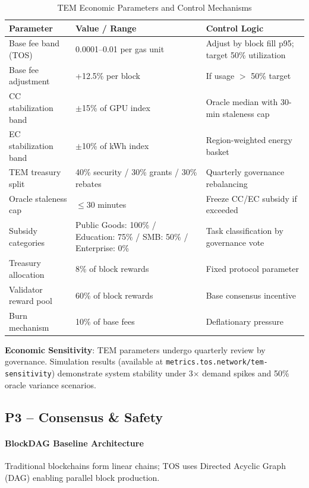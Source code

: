 \documentclass[11pt]{article}
\begin{document}
\begin{table}[H]
\centering
\caption{TEM Economic Parameters and Control Mechanisms}
\label{tab:tem-parameters}
\begin{tabular}{@{}p{}p{}p{}@{}}
\toprule
\textbf{Parameter} & \textbf{Value / Range} & \textbf{Control Logic} \\ \midrule
Base fee band (TOS) & 0.0001--0.01 per gas unit & Adjust by block fill p95; target 50\% utilization \\
Base fee adjustment & +12.5\% per block & If usage $>$ 50\% target \\
CC stabilization band & $\pm$15\% of GPU index & Oracle median with 30-min staleness cap \\
EC stabilization band & $\pm$10\% of kWh index & Region-weighted energy basket \\
TEM treasury split & 40\% security / 30\% grants / 30\% rebates & Quarterly governance rebalancing \\
Oracle staleness cap & $\le$30 minutes & Freeze CC/EC subsidy if exceeded \\
Subsidy categories & Public Goods: 100\% / Education: 75\% / SMB: 50\% / Enterprise: 0\% & Task classification by governance vote \\
Treasury allocation & 8\% of block rewards & Fixed protocol parameter \\
Validator reward pool & 60\% of block rewards & Base consensus incentive \\
Burn mechanism & 10\% of base fees & Deflationary pressure \\
\bottomrule
\end{tabular}
\end{table}

\textbf{Economic Sensitivity}: TEM parameters undergo quarterly review by governance. Simulation results (available at \texttt{metrics.tos.network/tem-sensitivity}) demonstrate system stability under 3$\times$ demand spikes and 50\% oracle variance scenarios.

\subsection{P3 -- Consensus \& Safety}
\label{sec:pillar-consensus}

\paragraph{BlockDAG Baseline Architecture}
Traditional blockchains form linear chains; TOS uses Directed Acyclic Graph (DAG) enabling parallel block production.
\end{document}
